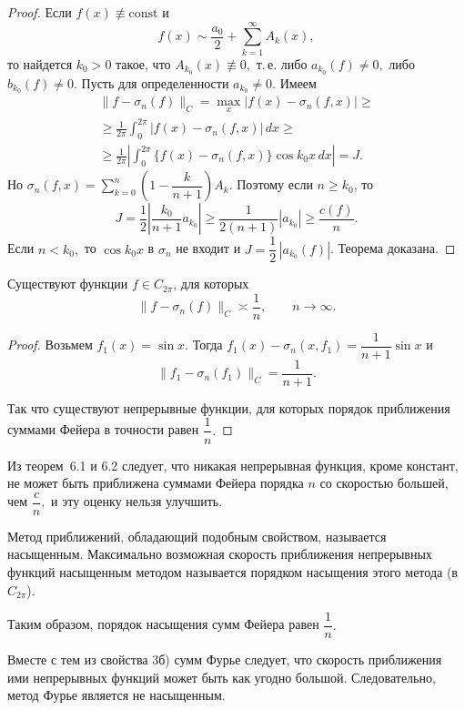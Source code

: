 {\begin{proof}
Если $f(x)\not\equiv\mathrm{const}$ и
$$
f(x) \sim \frac{a_0}{2}+\sum\limits_{k=1}^{\infty} A_k(x),
$$
то найдется $k_0>0$ такое, что $A_{k_0}(x) \not\equiv 0,$ т.\,е. либо
$a_{k_0}(f)\ne 0,$ либо {$b_{k_0}(f)\ne 0.$}  Пусть для
определенности $a_{k_0}\ne 0.$ {Имеем}
\begin{multline*}
\|f-\sigma_n(f)\|_C=\max\limits_{x} |f(x)-\sigma_n(f,x)|\ge \\ \ge \frac{1}{2\pi} \int_{0}^{2\pi} |f(x)-\sigma_n(f,x)|\, dx \ge \\ \ge
\frac{1}{2\pi} \left| \int_{0}^{2\pi} \{ f(x)-\sigma_n(f,x)\} \cos k_0x\, dx \right|=J.
\end{multline*}
Но $\sigma_n(f,x)=\sum\limits_{k=0}^n \left(1-\dfrac{k}{n+1}\right) A_k$. Поэтому если $n\ge k_0$, то
$$
J=\frac{1}{2} \left| \frac{k_0}{n+1} a_{k_0}
\right|
\ge \frac{1}{2(n+1)} |a_{k_0}|\ge \frac{c(f)}{n}.
$$
Если $n<k_0,$ то $\cos k_0x$ в $\sigma_n$ не входит и $J=\dfrac{1}{2}\,|a_{k_0}(f)|$. Теорема доказана.
\end{proof}

\begin{teo}
Существуют функции $f\in C_{2\pi}$, для которых
$$
\|f-\sigma_n(f)\|_C \asymp \frac{1}{n}, \qquad n\to\infty.
$$
\end{teo}

\begin{proof}
Возьмем $f_1(x)=\sin x$. Тогда $f_1(x)-\sigma_n(x,f_1)=\dfrac{1}{n+1} \sin x$ и
$$
\|f_1-\sigma_n(f_1)\|_C=\frac{1}{n+1}.
$$

Так что существуют непрерывные функции, для которых порядок
приближения суммами Фейера в точности равен $\dfrac{1}{n}.$
\end{proof}

Из теорем~6.1 и 6.2 следует, что никакая непрерывная
функция, кроме констант, не может быть приближена суммами
Фейера порядка $n$ со скоростью большей, чем
$\dfrac{c}{n},$ и эту оценку нельзя улучшить.

Метод приближений, обладающий подобным свойством,
называется насыщенным. Максимально возможная скорость
приближения непрерывных функций насыщенным
методом называется порядком насыщения этого метода (в $C_{2\pi}$).

Таким образом, порядок насыщения сумм Фейера равен $\dfrac{1}{n}.$

Вместе с тем из свойства 3б) сумм Фурье следует, что
скорость приближения ими непрерывных функций может быть как
угодно большой. Следовательно, метод Фурье является не
насыщенным.

}
